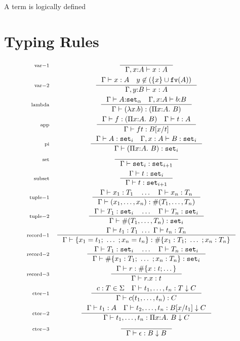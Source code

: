 \documentclass{article}
\newcommand{\rectyp}[1]{\#\{#1\}}
\newcommand{\recval}[1]{\{#1\}}
\newcommand{\fn}[1]{\mathtt{#1}}
\newcommand{\set}[1]{\fn{set}_{#1}}
\newcommand{\rctor}[3]{{#1} : {#2} \downarrow {#3}}
\newcommand{\Piexpr}[3]{\Pi {#1}{:}{#2}.\ {#3}}
\newcommand{\rlbl}[1]{\mathrm{\scriptstyle{}#1}}
\begin{document}
A term is logically defined

\section{Typing Rules}
\begin{gather*}
\begin{array}{rc}
\rlbl{var-1}&
\inference{}{\Gamma, x{:}A |- x : A}\\[1em]
\rlbl{var-2}&
\inference{\Gamma |- x : A \quad y \not\in (\{x\} \cup \fn{fv}(A))}
          {\Gamma,y{:}B |- x : A}\\[1em]
\rlbl{lambda}&
\inference{\Gamma |- A{:}\set{\alpha} \quad \Gamma,x{:}A |- b{:}B}
          {\Gamma |- (\lambda x . b) : (\Piexpr{x}{A}{B})}\\[1em]
\rlbl{app}&
\inference{\Gamma |- f : (\Piexpr{x}{A}{B}) \quad \Gamma |- t : A  }
          {\Gamma |- f t : B[x/t] }\\[1em]
\rlbl{pi}&
\inference{\Gamma |- A : \set{i} \quad \Gamma,x:A |- B : \set{i}}
          {\Gamma |- (\Piexpr{x}{A}{B}) : \set{i}}\\[1em]
\rlbl{set}&
\inference{}{\Gamma |- \set{i} : \set{i+1}}\\[1em]
\rlbl{subset}&
\inference{\Gamma |- t : \set{i}}{\Gamma |- t : \set{i+1}}\\[1em]
\rlbl{tuple-1}&
\inference{\Gamma |- x_1 : T_1 \quad \dots \quad \Gamma |- x_n : T_n}
          {\Gamma |- (x_1, \dots, x_n) : \#(T_1, \dots, T_n)}\\[1em]
\rlbl{tuple-2}&
\inference{\Gamma |- T_1 : \set{i} \quad \dots \quad \Gamma |- T_n : \set{i}}
          {\Gamma |- \#(T_1, \dots, T_n) : \set{i}}\\[1em]
\rlbl{record-1}&
\inference{\Gamma |- t_1 : T_1\ \dots\ \Gamma |- t_n : T_n }
          {\Gamma |- \recval{ x_1 = t_1;\ \dots\ ; x_n = t_n} 
                   : \rectyp{ x_1 : T_1;\ \dots\ ; x_n : T_n}}\\[1em]
\rlbl{record-2}&
\inference{\Gamma |- T_1 : \set{i} \quad \dots \quad \Gamma |- T_n : \set{i}}
          {\Gamma |- \rectyp{ x_1 : T_1;\ \dots\ ; x_n : T_n} : \set{i}}\\[1em]
\rlbl{record-3}&
\inference{\Gamma |- r : \rectyp{ x : t; \dots }}
          {\Gamma |- r.x : t }\\[1em]
\rlbl{ctor-1}&
\inference{c : T \in \Sigma \quad \Gamma |- \rctor{t_1,\dots,t_n}{T}{C}}
          {\Gamma |- c(t_1,\dots,t_n) : C}\\[1em]
\rlbl{ctor-2}&
\inference{\Gamma|- t_1 : A \quad \Gamma |- \rctor{t_2,\dots,t_n}{B[x/t_1]}{C}}
          {\Gamma |- \rctor{t_1,\dots,t_n}{\Piexpr{x}{A}{B}}{C}}\\[1em]
\rlbl{ctor-3}&
\inference{}{\Gamma |- \rctor{\epsilon}{B}{B}}\\[1em]
\end{array}
\end{gather*}
\end{document}
